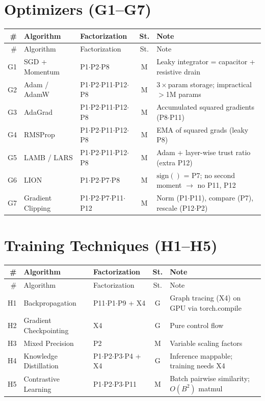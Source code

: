 \documentclass[10pt]{article}
\begin{document}
\section{Optimizers (G1--G7)}

\begin{longtable}{rlp{3.0cm}cp{4.8cm}}
\toprule
\# & Algorithm & Factorization & St. & Note \\
\midrule
\endfirsthead
\toprule
\# & Algorithm & Factorization & St. & Note \\
\midrule
\endhead
\bottomrule
\endfoot
G1 & SGD + Momentum & P1$\cdot$P2$\cdot$P8 & M & Leaky integrator = capacitor + resistive drain \\
G2 & Adam / AdamW & P1$\cdot$P2$\cdot$P11$\cdot$P12$\cdot$P8 & M & $3\times$param storage; impractical $>$1M params \\
G3 & AdaGrad & P1$\cdot$P2$\cdot$P11$\cdot$P12$\cdot$P8 & M & Accumulated squared gradients (P8$\cdot$P11) \\
G4 & RMSProp & P1$\cdot$P2$\cdot$P11$\cdot$P12$\cdot$P8 & M & EMA of squared grads (leaky P8) \\
G5 & LAMB / LARS & P1$\cdot$P2$\cdot$P11$\cdot$P12$\cdot$P8 & M & Adam + layer-wise trust ratio (extra P12) \\
G6 & LION & P1$\cdot$P2$\cdot$P7$\cdot$P8 & M & $\mathrm{sign}()$ = P7; no second moment $\to$ no P11, P12 \\
G7 & Gradient Clipping & P1$\cdot$P2$\cdot$P7$\cdot$P11$\cdot$P12 & M & Norm (P1$\cdot$P11), compare (P7), rescale (P12$\cdot$P2) \\
\end{longtable}

\section{Training Techniques (H1--H5)}

\begin{longtable}{rlp{3.0cm}cp{4.8cm}}
\toprule
\# & Algorithm & Factorization & St. & Note \\
\midrule
\endfirsthead
\toprule
\# & Algorithm & Factorization & St. & Note \\
\midrule
\endhead
\bottomrule
\endfoot
H1 & Backpropagation & P11$\cdot$P1$\cdot$P9 + X4 & G & Graph tracing (X4) on GPU via torch.compile \\
H2 & Gradient Checkpointing & X4 & G & Pure control flow \\
H3 & Mixed Precision & P2 & M & Variable scaling factors \\
H4 & Knowledge Distillation & P1$\cdot$P2$\cdot$P3$\cdot$P4 + X4 & G & Inference mappable; training needs X4 \\
H5 & Contrastive Learning & P1$\cdot$P2$\cdot$P3$\cdot$P11 & M & Batch pairwise similarity; $O(B^2)$ matmul \\
\end{longtable}
\end{document}
